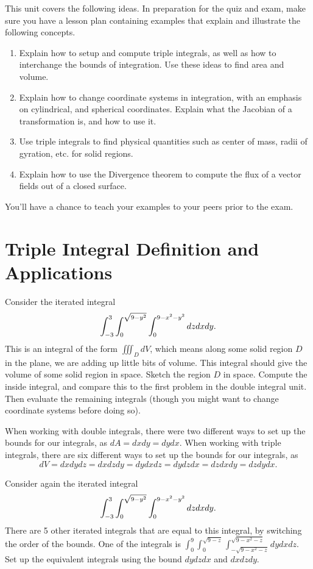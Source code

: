 
\noindent 
This unit covers the following ideas. In preparation for the quiz and exam, make sure you have a lesson plan containing examples that explain and illustrate the following concepts.  
\begin{enumerate}
\item Explain how to setup and compute triple integrals, as well as how to interchange the bounds of integration. Use these ideas to find area and volume. 
\item Explain how to change coordinate systems in integration, with an emphasis on cylindrical, and spherical coordinates. Explain what the Jacobian of a transformation is, and how to use it. 
\item Use triple integrals to find physical quantities such as center of mass, radii of gyration, etc. for solid regions.
\item Explain how to use the Divergence theorem to compute the flux of a vector fields out of a closed surface. 
\end{enumerate}
You'll have a chance to teach your examples to your peers prior to the exam.


\section{Triple Integral Definition and Applications}

\begin{problem}
Consider the iterated integral $$\displaystyle \int_{-3}^3 \int_0^{\sqrt{9-y^2}}\int_0^{9-x^2-y^2} dzdxdy.$$ This is an integral of the form $\iiint_D dV$, which means along some solid region $D$ in the plane, we are adding up little bits of volume. This integral should give the volume of some solid region in space.  Sketch the region $D$ in space.  Compute the inside integral, and compare this to the first problem in the double integral unit.  Then evaluate the remaining integrals (though you might want to change coordinate systems before doing so).
\end{problem}

When working with double integrals, there were two different ways to set up the bounds for our integrals, as $dA=dxdy=dydx$.  When working with triple integrals, there are six different ways to set up the bounds for our integrals, as $$dV=dxdydz = dxdzdy = dydxdz=dydzdx=dzdxdy=dzdydx.$$ 

\begin{problem}
Consider again the iterated integral $$\displaystyle \int_{-3}^3 \int_0^{\sqrt{9-y^2}}\int_0^{9-x^2-y^2} dzdxdy.$$ There are 5 other iterated integrals that are equal to this integral, by switching the order of the bounds. One of the integrals is $\int_0^9\int_0^{\sqrt{9-z}}\int_{-\sqrt{9-x^2-z}}^{\sqrt{9-x^2-z}} dydxdz$. Set up the equivalent integrals using the bound $dydzdx$ and $dxdzdy$.   
\end{problem}

